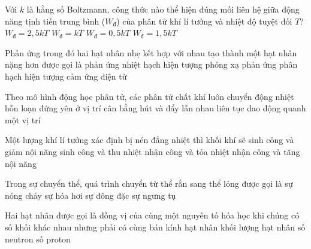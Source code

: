 	\begin{ex}%
		Với $k$ là hằng số Boltzmann, công thức nào thể hiện đúng mối liên hệ giữa động năng tịnh tiến trung bình ($W_{\text{đ}}$) của phân tử khí lí tưởng và nhiệt độ tuyệt đối $T$?
		\choice
		{$W_{\text{đ}}=2{,}5kT$}
		{$W_{\text{đ}}=kT$}
		{$W_{\text{đ}}=0{,}5kT$}
		{\True $W_{\text{đ}}=1{,}5kT$}
	\end{ex}

	\begin{ex}%
		Phản ứng trong đó hai hạt nhân nhẹ kết hợp với nhau tạo thành một hạt nhân nặng hơn được gọi là
		\choice
		{\True phản ứng nhiệt hạch}
		{hiện tượng phóng xạ}
		{phản ứng phân hạch}
		{hiện tượng cảm ứng điện từ}
	\end{ex}

	\begin{ex}%
		Theo mô hình động học phân tử, các phân tử chất khí luôn
		\choice
		{\True chuyển động nhiệt hỗn loạn}
		{đứng yên ở vị trí cân bằng}
		{hút và đẩy lẫn nhau liên tục}
		{dao động quanh một vị trí}
	\end{ex}

	\begin{ex}%
		Một lượng khí lí tưởng xác định bị nén đẳng nhiệt thì khối khí sẽ
		\choice
		{sinh công và giảm nội năng}
		{sinh công và thu nhiệt}
		{\True nhận công và tỏa nhiệt}
		{nhận công và tăng nội năng}
	\end{ex}

	\begin{ex}%
		Trong sự chuyển thể, quá trình chuyển từ thể rắn sang thể lỏng được gọi là
		\choice
		{\True sự nóng chảy}
		{sự hóa hơi}
		{sự đông đặc}
		{sự ngưng tụ}
	\end{ex}

	\begin{ex}%
		Hai hạt nhân được gọi là đồng vị của cùng một nguyên tố hóa học khi chúng có số khối khác nhau nhưng phải có cùng
		\choice
		{bán kính hạt nhân}
		{khối lượng hạt nhân}
		{số neutron}
		{\True số proton}
	\end{ex}


